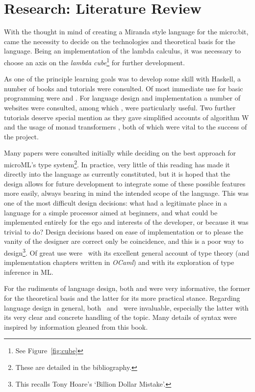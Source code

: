 \documentclass[12pt, a4paper]{report}
\begin{document}
\section{Research: Literature Review}
With the thought in mind of creating a Miranda style language for the micro:bit, came the necessity
to decide on the technologies and theoretical basis for the language. Being an implementation of the
lambda calculus, it was necessary to choose an axis on the \textit{lambda cube}\footnote{See
Figure~\ref{fig:cube}} for further development. 

As one of the principle learning goals was to develop some skill with Haskell, a number of books and
tutorials were consulted. Of most immediate use for basic programming were \cite{Lipovaca:2011:LYH:2018642}
and \cite{rwh}. For language design and implementation a number of websites were consulted, among which
\cite{scheme}, \cite{diehl} were particularly useful. Two further tutorials deserve special mention
as they gave simplified accounts of algorithm W \cite{algoW} and the usage of monad transformers
\cite{transformers}, both of which were vital to the success of the project.

Many papers were consulted initially while deciding on the best approach for microML's type
system\footnote{These are detailed in the bibliography.}. In practice, very little of this
reading has made it directly into the language as currently constituted, but it is hoped that the
design allows for future development to integrate some of these possible features more easily,
always bearing in mind the intended scope of the language. This was one of the most difficult
design decisions: what had a legitimate place in a language for a simple processor aimed at
beginners, and what could be implemented entirely for the ego and interests of the developer, or because it
was trivial to do? Design decisions based on ease of implementation or to please the vanity of the
designer are correct only be coincidence, and this is a poor way to design\footnote{This recalls
Tony Hoare's `Billion Dollar Mistake'.}. Of great use were~\cite{Pierce:2002:TPL:509043} with its
excellent general account of type theory (and implementation chapters written in \textit{OCaml})
and\@\cite{Pierce:2004:ATT:1076265} with its exploration of type inference in ML\@.

For the rudiments of language design, both\@\cite{spj2} and\@\cite{spj1} were very informative, the
former for the theoretical basis and the latter for its more practical stance. Regarding language
design in general, both~\cite{Harper:2012:PFP:2431407} and~\cite{plp} were invaluable, especially
the latter with its very clear and concrete handling of the topic. Many details of syntax were
inspired by information gleaned from this book.
\end{document}
